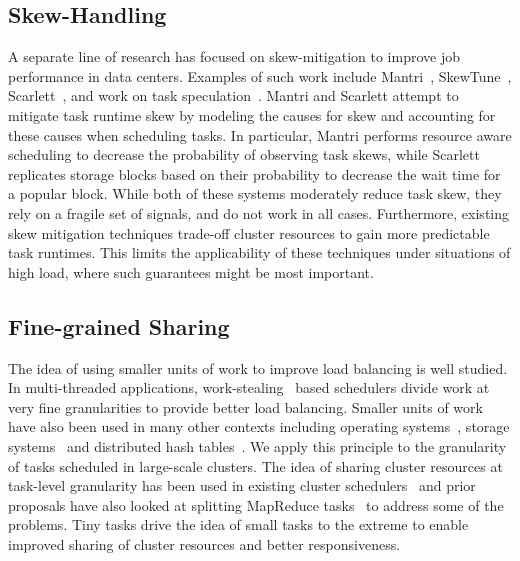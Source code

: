 \subsection{Skew-Handling}
A separate line of research has focused on skew-mitigation to improve job
performance in data centers. Examples of such work include
Mantri~\cite{ananthanarayanan2010reining}, SkewTune~\cite{kwon2012skewtune},
Scarlett~\cite{ananthanarayanan2011scarlett}, and work on task
speculation~\cite{zaharia2008improving}. Mantri and Scarlett attempt to
mitigate task runtime skew by modeling the causes for skew and accounting for
these causes when scheduling tasks. In particular, Mantri performs resource aware scheduling to decrease the
probability of observing task skews, while Scarlett replicates storage blocks
based on their probability to decrease the wait time for a popular block. While
both of these systems moderately reduce task skew, they rely on a fragile set of
signals, and do not work in all cases.
Furthermore, existing skew mitigation techniques trade-off cluster resources to
gain more predictable task runtimes. This limits the applicability of these
techniques under situations of high load, where such guarantees might be most
important.

\subsection{Fine-grained Sharing}
The idea of using smaller units of work to improve load balancing is well
studied.  In multi-threaded applications, work-stealing~\cite{blumofe1994scheduling}
based schedulers divide work at very fine granularities to provide better load
balancing.  Smaller units of work have also been used in many other contexts
including operating systems~\cite{sherman1972trace}, storage systems~\cite{ghemawat2003google,
chang2008bigtable} and distributed hash tables~\cite{stoica2001chord}. We apply this
principle to the granularity of tasks scheduled in large-scale clusters.  The
idea of sharing cluster resources at task-level granularity has been used in
existing cluster schedulers~\cite{hindman2011mesos, zaharia2010delay} and prior
proposals have also looked at splitting MapReduce tasks~\cite{bhatotia2011incoop} to
address some of the problems.
Tiny tasks drive the idea of small tasks to the extreme to enable improved
sharing of cluster resources
and better responsiveness.


